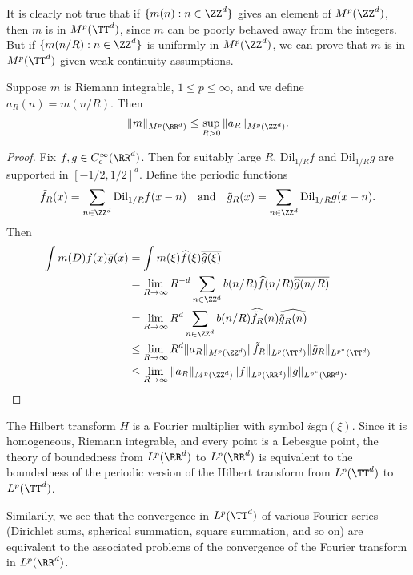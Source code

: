 It is clearly not true that if $\{ m(n) : n \in \ZZ^d \}$ gives an element of $M^p(\ZZ^d)$, then $m$ is in $M^p(\TT^d)$, since $m$ can be poorly behaved away from the integers. But if $\{ m(n/R) : n \in \ZZ^d \}$ is uniformly in $M^p(\ZZ^d)$, we can prove that $m$ is in $M^p(\TT^d)$ given weak continuity assumptions.

\begin{theorem}
    Suppose $m$ is Riemann integrable, $1 \leq p \leq \infty$, and we define $a_R(n) = m(n/R)$. Then
    \[ \| m \|_{M^p(\RR^d)} \leq \sup_{R > 0} \| a_R \|_{M^p(\ZZ^d)}. \]
\end{theorem}
\begin{proof}
    Fix $f,g \in C_c^\infty(\RR^d)$. Then for suitably large $R$, $\text{Dil}_{1/R} f$ and $\text{Dil}_{1/R} g$ are supported in $[-1/2,1/2]^d$. Define the periodic functions
    \[ \tilde{f}_R(x) = \sum_{n \in \ZZ^d} \text{Dil}_{1/R} f(x - n) \quad\text{and}\quad \tilde{g}_R(x) = \sum_{n \in \ZZ^d} \text{Dil}_{1/R} g(x - n). \]
    Then
    \begin{align*}
        \int m(D) f(x) \overline{g}(x) &= \int m(\xi) \widehat{f}(\xi) \overline{\widehat{g}(\xi)}\\
        &= \lim_{R \to \infty} R^{-d} \sum_{n \in \ZZ^d} b(n/R) \widehat{f}(n/R) \overline{\widehat{g}(n/R)}\\
        &= \lim_{R \to \infty} R^d \sum_{n \in \ZZ^d} b(n/R) \widehat{\tilde{f}_R}(n) \widehat{\tilde{g}_R(n)}\\
        &\leq \lim_{R \to \infty} R^d \| a_R \|_{M^p(\ZZ^d)} \| \tilde{f}_R \|_{L^p(\TT^d)} \| \tilde{g}_R \|_{L^{p^*}(\TT^d)}\\
        &\leq \lim_{R \to \infty} \| a_R \|_{M^p(\ZZ^d)} \| f \|_{L^p(\RR^d)} \| g \|_{L^{p^*}(\RR^d)}.
    \end{align*}
\end{proof}

\begin{example}
    The Hilbert transform $H$ is a Fourier multiplier with symbol $i \text{sgn}(\xi)$. Since it is homogeneous, Riemann integrable, and every point is a Lebesgue point, the theory of boundedness from $L^p(\RR^d)$ to $L^p(\RR^d)$ is equivalent to the boundedness of the periodic version of the Hilbert transform from $L^p(\TT^d)$ to $L^p(\TT^d)$.
\end{example}

Similarily, we see that the convergence in $L^p(\TT^d)$ of various Fourier series (Dirichlet sums, spherical summation, square summation, and so on) are equivalent to the associated problems of the convergence of the Fourier transform in $L^p(\RR^d)$.

